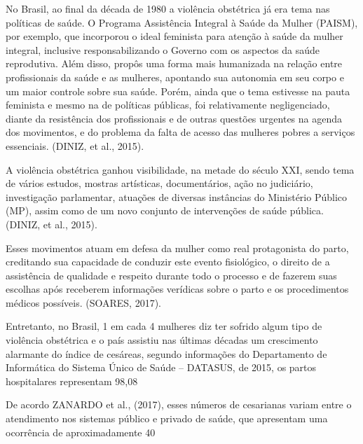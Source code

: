 No Brasil, ao final da década de 1980 a violência obstétrica já era tema nas políticas de saúde. O Programa Assistência Integral à Saúde da Mulher (PAISM), por exemplo, que incorporou o ideal feminista para atenção à saúde da mulher integral, inclusive responsabilizando o Governo com os aspectos da saúde reprodutiva. Além disso, propôs uma forma mais humanizada na relação entre profissionais da saúde e as mulheres, apontando sua autonomia em seu corpo e um maior controle sobre sua saúde. Porém, ainda que o tema estivesse na pauta feminista e mesmo na de políticas públicas, foi relativamente negligenciado, diante da resistência dos profissionais e de outras questões urgentes na agenda dos movimentos, e do problema da falta de acesso das mulheres pobres a serviços essenciais. (DINIZ, et al., 2015).

A violência obstétrica ganhou visibilidade, na metade do século XXI, sendo tema de vários estudos, mostras artísticas, documentários, ação no judiciário, investigação parlamentar, atuações de diversas instâncias do Ministério Público (MP), assim como de um novo conjunto de intervenções de saúde pública. (DINIZ, et al., 2015).

Esses movimentos atuam em defesa da mulher como real protagonista do parto, creditando sua capacidade de conduzir este evento fisiológico, o direito de a assistência de qualidade e respeito durante todo o processo e de fazerem suas escolhas após receberem informações verídicas sobre o parto e os procedimentos médicos possíveis. (SOARES, 2017).

Entretanto, no Brasil, 1 em cada 4 mulheres diz ter sofrido algum tipo de violência obstétrica e o país assistiu nas últimas décadas um crescimento alarmante do índice de cesáreas, segundo informações do Departamento de Informática do Sistema Único de Saúde – DATASUS, de 2015, os partos hospitalares representam 98,08%

De acordo ZANARDO et al., (2017), esses números de cesarianas variam entre o atendimento nos sistemas público e privado de saúde, que apresentam uma ocorrência de aproximadamente 40%

